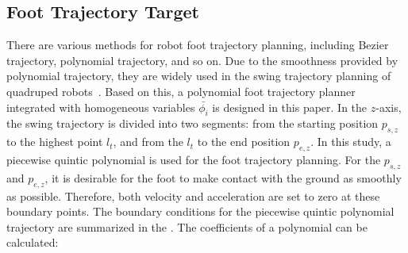 \subsection{Foot Trajectory Target}
\label{ap:Foot Target}
There are various methods for robot foot trajectory planning, including Bezier trajectory, polynomial trajectory, and so on. Due to the smoothness provided by polynomial trajectory, they are widely used in the swing trajectory planning of quadruped robots~\citep{LocManMPC2021RAL}. Based on this, a polynomial foot trajectory planner integrated with homogeneous variables $\bar{\phi_i}$ is designed in this paper.
In the $z$-axis, the swing trajectory is divided into two segments: from the starting position $p_{s,z}$ to the highest point $l_t$, and from the $l_t$ to the end position $p_{e, z}$. In this study, a piecewise quintic polynomial is used for the foot trajectory planning. For the $p_{s, z}$ and $p_{e, z}$, it is desirable for the foot to make contact with the ground as smoothly as possible. Therefore, both velocity and acceleration are set to zero at these boundary points. The boundary conditions for the piecewise quintic polynomial trajectory are summarized in the . 
The coefficients of a polynomial can be calculated:

